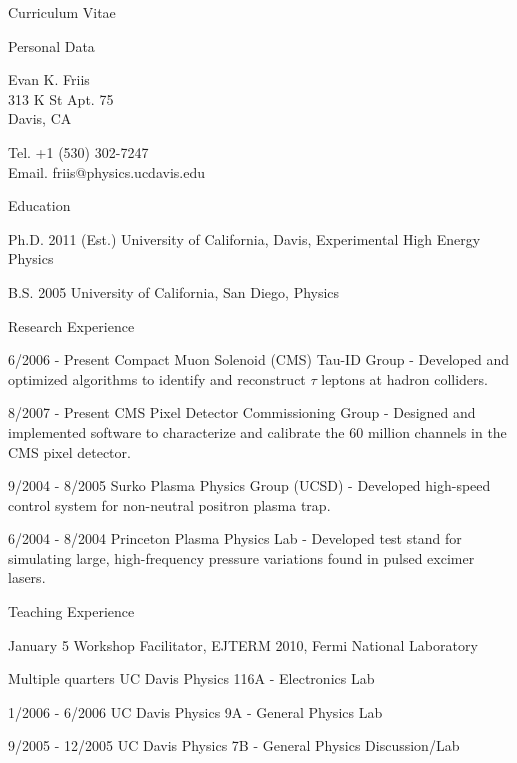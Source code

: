 \documentclass[12pt]{amsart}
\title{}
\author{}
\date{} %
\begin{document}
\nobibliography*
\begin{cv}{Curriculum Vitae}

\begin{cvlist}{Personal Data}
\item Evan K. Friis\\
313 K St Apt. 75\\
Davis, CA

\item Tel. +1 (530) 302-7247\\
Email. friis@physics.ucdavis.edu
\end{cvlist}

\begin{cvlist}{Education}
\item[Ph.D. 2011 (Est.)] University of California, Davis, Experimental High Energy Physics
\item[B.S. 2005] University of California, San Diego, Physics
\end{cvlist}

\begin{cvlist}{Research Experience}
\item[6/2006 - Present] Compact Muon Solenoid (CMS) Tau-ID Group - Developed and optimized algorithms to identify and reconstruct $\tau$ leptons at hadron colliders.
\item[8/2007 - Present] CMS Pixel Detector Commissioning Group - Designed and implemented software to characterize and calibrate the 60 million channels in the CMS pixel detector.
\item[9/2004 - 8/2005] Surko Plasma Physics Group (UCSD) - Developed high-speed control system for non-neutral positron plasma trap.
\item[6/2004 - 8/2004] Princeton Plasma Physics Lab - Developed test stand for simulating large, high-frequency pressure variations found in pulsed excimer lasers.
\end{cvlist}

\begin{cvlist}{Teaching Experience}
\item[January 5] Workshop Facilitator, EJTERM 2010, Fermi National Laboratory
\item[Multiple quarters] UC Davis Physics 116A - Electronics Lab
\item[1/2006 - 6/2006] UC Davis Physics 9A - General Physics Lab
\item[9/2005 - 12/2005] UC Davis Physics 7B - General Physics Discussion/Lab
\end{cvlist}


\end{cv}
\end{document}
